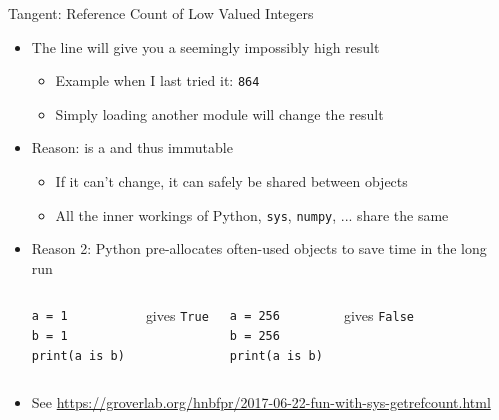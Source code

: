 \begin{frame}[fragile]{Tangent: Reference Count of Low Valued Integers}
%
\begin{itemize}
\item The line  will give you a seemingly impossibly high result
	\begin{itemize}
	\item Example when I last tried it: \texttt{864}
	\item Simply loading another module will change the result
	\end{itemize}
\item Reason:  is a  and thus immutable
	\begin{itemize}
	\item If it can't change, it can safely be shared between objects
	\item All the inner workings of Python, \texttt{sys}, \texttt{numpy}, ... share the same 
	\end{itemize}
\item Reason 2: Python pre-allocates often-used objects to save time in the long run
	\begin{columns}
\begin{verbatim}
a = 1
b = 1
print(a is b)
\end{verbatim}
		gives \texttt{True}
\begin{verbatim}
a = 256
b = 256
print(a is b)
\end{verbatim}
		gives \texttt{False}
	\end{columns}
\item See \url{https://groverlab.org/hnbfpr/2017-06-22-fun-with-sys-getrefcount.html}
\end{itemize}
%
\end{frame}


